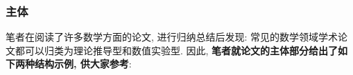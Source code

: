\documentclass{formatBook}
\newcommand{\XG}[1]{\textcolor{red}{#1}}
\begin{document}
\subsubsection{主体}
笔者在阅读了许多数学方面的论文, 进行归纳总结后发现: 常见的数学领域学术论文都可以归类为理论推导型和数值实验型. 因此, \textbf{笔者就论文的主体部分给出了如下两种结构示例, 供大家参考}:

\end{document}
